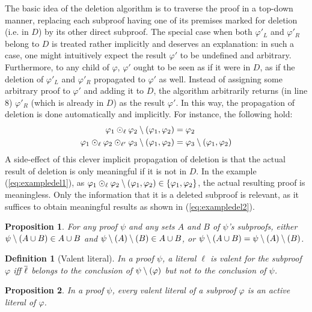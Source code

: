 \documentclass{easychair}
\newtheorem{definition}{Definition}
\newtheorem{proposition}{Proposition}
\begin{document}
The basic idea of the deletion algorithm is to traverse the proof in a top-down manner, replacing
each subproof having one of its premises marked for deletion (i.e. in $D$) by its other direct
subproof. The special case when both $\varphi'_L$ and $\varphi'_R$ belong to $D$ is treated rather
implicitly and deserves an explanation: in such a case, one might intuitively expect the result
$\varphi'$ to be undefined and arbitrary. Furthermore, to any child of $\varphi$, $\varphi'$ ought
to be seen as if it were in $D$, as if the deletion of $\varphi'_L$ and $\varphi'_R$ propagated to
$\varphi'$ as well. Instead of assigning some arbitrary proof to $\varphi'$ and adding it to $D$,
the algorithm arbitrarily returns (in line 8) $\varphi'_R$ (which is already in $D$) as the result
$\varphi'$. In this way, the propagation of deletion is done automatically and implicitly. For
instance, the following hold:
\begin{align}
  \varphi_1 \odot_\ell \varphi_2 \setminus (\varphi_1, \varphi_2) &= \varphi_2 \label{eq:exampledel1} \\
\varphi_1 \odot_\ell \varphi_2 \odot_{\ell'} \varphi_3 \setminus (\varphi_1, \varphi_2) &=
  \varphi_3 \setminus (\varphi_1, \varphi_2) \label{eq:exampledel2}
\end{align}
A side-effect of this clever implicit propagation of deletion is that the actual result of deletion
is only meaningful if it is not in $D$. In the example (\ref{eq:exampledel1}), as $\varphi_1
\odot_\ell \varphi_2 \setminus (\varphi_1, \varphi_2) \in \{\varphi_1, \varphi_2\} $, the actual resulting
proof is meaningless. Only the information that it is a deleted subproof is relevant, as it suffices
to obtain meaningful results as shown in (\ref{eq:exampledel2}).

\begin{proposition} \label{prop:del_assoc}
For any proof $\psi$ and any sets $A$ and $B$ of $\psi$'s subproofs,
either $\psi \setminus (A \cup B)  \in A \cup B$
and    $\psi \setminus (A) \setminus (B) \in A \cup B$,
or     $\psi \setminus (A \cup B) = \psi \setminus (A) \setminus (B)$.
\end{proposition}


\begin{definition}[Valent literal]
  In a proof $\psi$, a literal $\ell$ is \emph{valent} for the subproof $\varphi$ iff $\overline{\ell}$
  belongs to the conclusion of $\psi \setminus (\varphi)$ but not to the conclusion of $\psi$.
\end{definition}

\begin{proposition} \label{prop:valentactive}
In a proof $\psi$, every valent literal of a subproof $\varphi$ is an active literal of $\varphi$.
\end{proposition}
\end{document}
